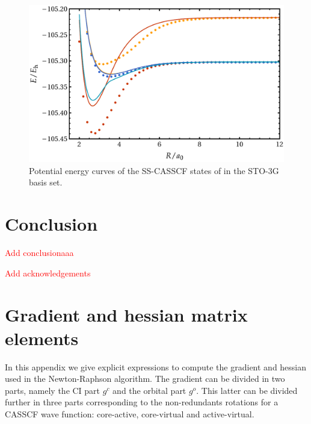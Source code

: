 \documentclass[aps,prb,reprint,showkeys,superscriptaddress]{revtex4-1}
\newcommand{\todo}[1]{\textcolor{red}{#1}}
\begin{document}
\begin{figure}
  \centering
  \includegraphics[width=0.9\linewidth]{Figures/fig_7.pdf}
  \caption{Potential energy curves of the SS-CASSCF states of  in the STO-3G basis set. \label{fig:fig_7}}
\end{figure}

\section{Conclusion}
\label{sec:conclusion}

\todo{Add conclusionaaa}

\begin{acknowledgements}
\todo{Add acknowledgements}
\end{acknowledgements}

\appendix

\section{Gradient and hessian matrix elements}
\label{app:appendixA}

In this appendix we give explicit expressions to compute the gradient and hessian used in the Newton-Raphson algorithm.
The gradient can be divided in two parts, namely the CI part $g^c$ and the orbital part $g^o$.
This latter can be divided further in three parts corresponding to the non-redundants rotations for a CASSCF wave function: core-active, core-virtual and active-virtual.
\end{document}
